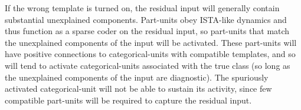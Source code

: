 \documentclass{article} %
\begin{document}


\begin{comment}
If only a single template is active (enforced by winner-take-all connections after convergence, as in figure~\ref{categorical_connection_figure}(b)), and all active part-units have orthogonal decoders that are either within or orthogonal to the tangent space (with equal negative connections from the orthogonal units), 
then the weighted sum of negative projections from the part units to the selected categorical-unit is the $\ell_1$ tangent distance.  %
This is actually close to the current network (FINISH).
\end{comment}

If the wrong template is turned on, the residual input will generally contain substantial unexplained components.  Part-units obey ISTA-like dynamics and thus function as a sparse coder on the residual input, so part-units that match the unexplained components of the input will be activated.  These part-units will have positive connections to categorical-units with compatible templates, and so will tend to activate categorical-units associated with the true class (so long as the unexplained components of the input are diagnostic).  The spuriously activated categorical-unit will not be able to sustain its activity, since few compatible part-units will be required to capture the residual input.  
\end{document}
